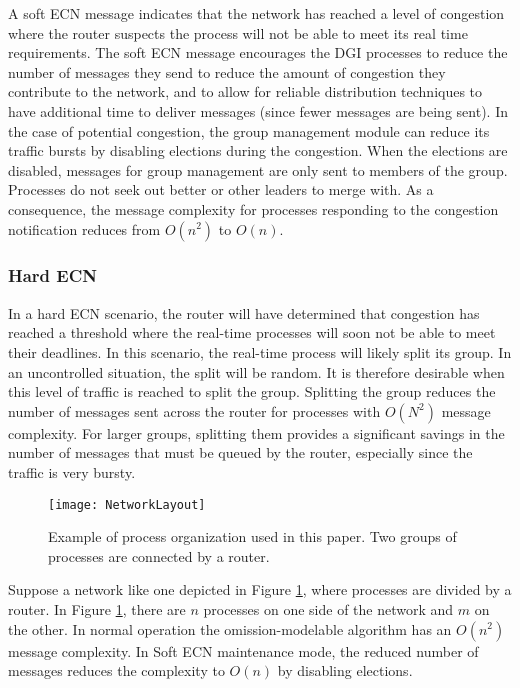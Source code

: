 A soft \ac{ECN} message indicates that the network has reached a level of congestion where the router suspects the process will not be able to meet its real time requirements.
The soft \ac{ECN} message encourages the \ac{DGI} processes to reduce the number of messages they send to reduce the amount of congestion they contribute to the network, and to allow for reliable distribution techniques to have additional time to deliver messages (since fewer messages are being sent).
In the case of potential congestion, the group management module can reduce its traffic bursts by disabling elections during the congestion.
When the elections are disabled, messages for group management are only sent to members of the group.
Processes do not seek out better or other leaders to merge with.
As a consequence, the message complexity for processes responding to the congestion notification reduces from $O(n^2)$ to $O(n)$.

\subsubsection{Hard \ac{ECN}}

In a hard \ac{ECN} scenario, the router will have determined that congestion has reached a threshold where the real-time processes will soon not be able to meet their deadlines.
In this scenario, the real-time process will likely split its group.
In an uncontrolled situation, the split will be random.
It is therefore desirable when this level of traffic is reached to split the group.
Splitting the group reduces the number of messages sent across the router for processes with $O(N^2)$ message complexity.
For larger groups, splitting them provides a significant savings in the number of messages that must be queued by the router, especially since the traffic is very bursty.

\begin{figure}
\texttt{[image: NetworkLayout]}
\caption{Example of process organization used in this paper. Two groups of processes are connected by a router.} \label{fig:network-layout}
\end{figure}

Suppose a network like one depicted in Figure \ref{fig:network-layout}, where processes are divided by a router.
In Figure \ref{fig:network-layout}, there are $n$ processes on one side of the network and $m$ on the other.
In normal operation the omission-modelable algorithm has an $O(n^2)$ message complexity.
In Soft \ac{ECN} maintenance mode, the reduced number of messages reduces the complexity to $O(n)$ by disabling elections.

